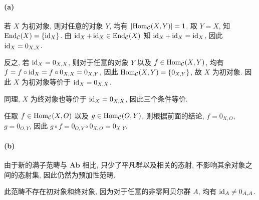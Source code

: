 \documentclass{article}
\begin{document}
\begin{solution}
	\paragraph{(a)} 若 $X$ 为初对象, 则对任意的对象 $Y$, 均有 $\left|\operatorname{Hom}_{\mathcal{C}}(X,Y)\right| = 1$. 取 $Y = X$, 知 $\operatorname{End}_{\mathcal{C}}(X) = \{\operatorname{id}_X\}$. 由 $\operatorname{id}_X + \operatorname{id}_X \in \operatorname{End}_\mathcal{C}(X)$ 知 $\operatorname{id}_X + \operatorname{id}_X = \operatorname{id}_X$, 因此 $\operatorname{id}_X = 0_{X, X}$. 

	反之, 若 $\operatorname{id}_X = 0_{X, X}$, 则对于任意的对象 $Y$ 以及 $f \in \operatorname{Hom}_{\mathcal{C}}(X, Y)$, 均有 $f = f \circ \operatorname{id}_X = f \circ 0_{X, X} = 0_{X, Y}$, 因此 $\operatorname{Hom}_{\mathcal{C}}(X, Y) = \{0_{X, Y}\}$, 故 $X$ 为初对象. 因此 $X$ 为初对象等价于 $\operatorname{id}_X = 0_{X, X}$. 

	同理, $X$ 为终对象也等价于 $\operatorname{id}_X = 0_{X, X}$, 因此三个条件等价.

	任取 $f \in \operatorname{Hom}_{\mathcal{C}}(X, O)$ 以及 $g \in \operatorname{Hom}_{\mathcal{C}} (O, Y)$, 则根据前面的结论, $f = 0_{X, O}$, $g = 0_{O, Y}$, 因此 $g \circ f = 0_{O, Y} \circ 0_{X, O} = 0_{X, Y}$. 

	\paragraph{(b)} 由于新的满子范畴与 $\mathbf{Ab}$ 相比, 只少了平凡群以及相关的态射, 不影响其余对象之间的态射集, 因此仍然为预加性范畴. 

	此范畴不存在初对象和终对象, 因为对于任意的非零阿贝尔群 $A$, 均有 $\operatorname{id}_A \neq 0_{A, A}$. 
\end{solution}
\end{document}
